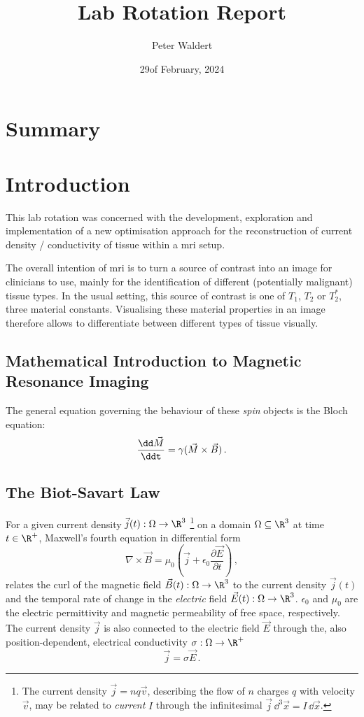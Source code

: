 \documentclass[12pt]{article}
\title{Lab Rotation Report}
\author{Peter Waldert}
\date{29\th of February, 2024}
\begin{document}
  \maketitle

  \section{Summary}
  \section{Introduction}
  This lab rotation was concerned with the development, exploration and implementation of a new optimisation approach for the reconstruction of current density / conductivity of tissue within a \gls{mri} setup.

  The overall intention of \gls{mri} is to turn a source of contrast into an image for clinicians to use, mainly for the identification of different (potentially malignant) tissue types.
  In the usual setting, this source of contrast is one of $T_1$, $T_2$ or $T_2^*$, three material constants.
  Visualising these material properties in an image therefore allows to differentiate between different types of tissue visually.

  \subsection{Mathematical Introduction to Magnetic Resonance Imaging}
  The general equation governing the behaviour of these \textit{spin} objects is the Bloch equation:
  \begin{equation}
    \frac{\dd \vec{M}}{\ddt} = \gamma (\vec{M} \times \vec{B})\,.
  \end{equation}

  \subsection{The Biot-Savart Law}
  For a given current density $\vec{j}(t): \Omega \to \R^3$ \footnote{
    The current density $\vec{j} = nq\vec{v}$, describing the flow of $n$ charges $q$ with velocity $\vec{v}$, may be related to \textit{current} $I$ through the infinitesimal $\vec{j} \,\dd^3\vec{x} = I \,\dd\vec{x}$.
  } on a domain $\Omega \subseteq \R^3$ at time $t \in \R^+$, Maxwell's fourth equation in differential form
  $$\nabla \times \vec{B} = \mu_0 \left(\vec{j} + \epsilon_0 \frac{\partial \vec{E}}{\partial t}\right)\,,$$
  relates the curl of the magnetic field $\vec{B}(t): \Omega \to \R^3$ to the current density $\vec{j}(t)$ and the temporal rate of change in the \textit{electric} field $\vec{E}(t): \Omega \to \R^3$.
  $\epsilon_0$ and $\mu_0$ are the electric permittivity and magnetic permeability of free space, respectively.
  The current density $\vec{j}$ is also connected to the electric field $\vec{E}$ through the, also position-dependent, electrical conductivity $\sigma: \Omega \to \R^+$
  $$\vec{j} = \sigma \vec{E}\,.$$
\end{document}
